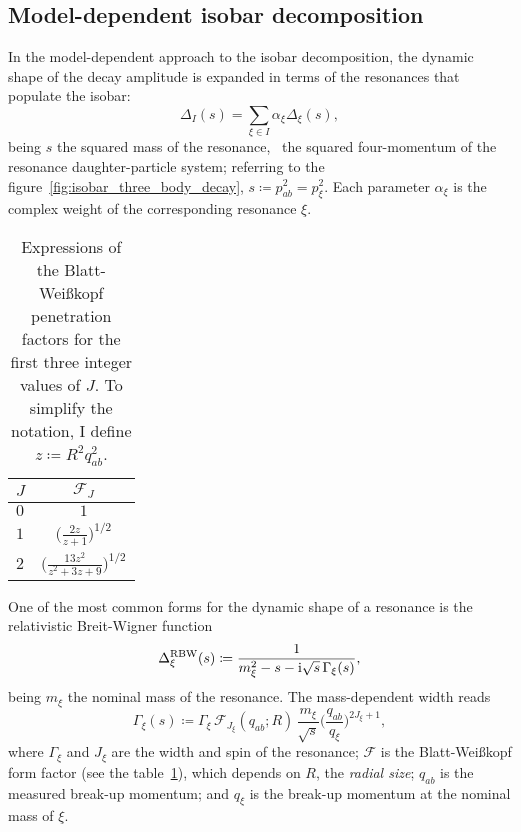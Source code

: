 \subsection{Model-dependent isobar decomposition}



    In the model-dependent approach to the isobar decomposition, the dynamic shape of the decay amplitude is expanded in terms of the resonances that populate the isobar:
    \begin{equation}\label{eq:isobar_mass_shape_expansion}
        \Delta_I(s) = \sum_{\xi\in I} \alpha_{\xi}\Delta_{\xi}(s),
    \end{equation}
    being $s$ the squared mass of the resonance, \ie~the squared four-momentum of the resonance daughter-particle system; referring to the figure~\ref{fig:isobar_three_body_decay}, $s\coloneqq p_{ab}^2 = p_{\xi}^2$.
    Each parameter $\alpha_{\xi}$ is the complex weight of the corresponding resonance $\xi$.


    \begin{table}
        \centering
        \caption{Expressions of the Blatt-Wei\ss{}kopf penetration factors for the first three integer values of $J$. To simplify the notation, I define $z\coloneqq R^2 q_{ab}^2$.}
        \label{table:blatt_weisskopf}
        \begin{tabular}{lc}
            \toprule
            $J$ &$\mathcal{F}_{\!J}$\\
            \midrule
            $0$ &$1$ \\
            $1$ &$\bigg(\displaystyle\frac{2z}{z + 1}\bigg)^{1/2}$ \\
            $2$ &$\bigg(\displaystyle\frac{13 z^2 }{z^2 + 3z + 9}\bigg)^{1/2}$ \\
            \bottomrule
        \end{tabular}
    \end{table}
    One of the most common forms for the dynamic shape of a resonance is the relativistic Breit-Wigner function
    \begin{equation}\label{eq:rbw}
        \Delta_{\xi}^{\text{RBW}}(s) \coloneqq \frac{1}{m_{\xi}^2 - s - \mathrm{i} \sqrt{s}\, \Gamma_\xi(s)},
    \end{equation}
    being $m_{\xi}$ the nominal mass of the resonance.
    The mass-dependent width reads
    \begin{equation}
        \Gamma_\xi(s) \coloneqq \Gamma_{\xi} \, \mathcal{F}_{\!J_\xi}\!(q_{ab};R)\, \frac{m_{\xi}}{\sqrt{s}} \bigg(\frac{q_{ab}}{q_{\xi}}\bigg)^{2J_{\xi}+1},
    \end{equation}
    where $\Gamma_{\xi}$ and $J_{\xi}$ are the width and spin of the resonance;
    $\mathcal{F}$ is the Blatt-Wei\ss{}kopf form factor (see the table~\ref{table:blatt_weisskopf}), which depends on $R$, the \emph{radial size};
    $q_{ab}$ is the measured break-up momentum;
    and $q_\xi$ is the break-up momentum at the nominal mass of $\xi$.


